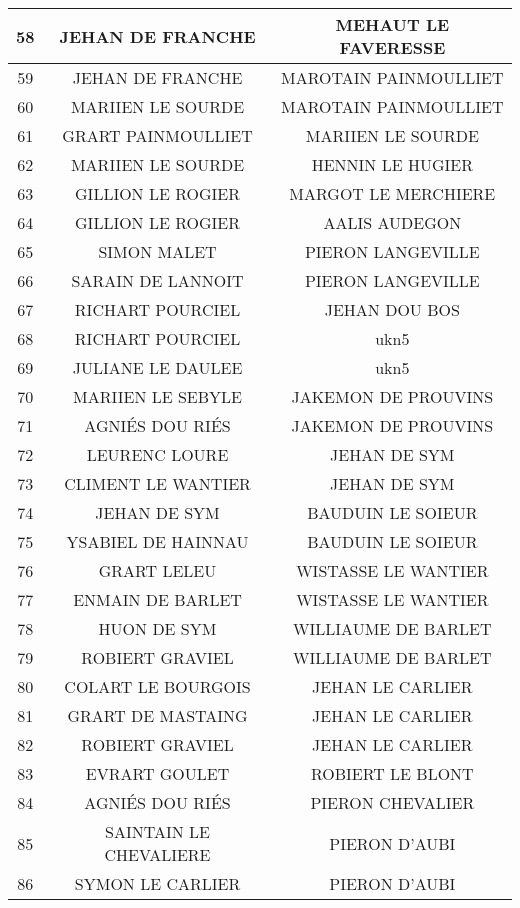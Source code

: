 \begin{center}
\begin{longtable}{|c|c|c|}
\hline	58	&	JEHAN DE FRANCHE	&	MEHAUT LE FAVERESSE	\\
\hline	59	&	JEHAN DE FRANCHE	&	MAROTAIN PAINMOULLIET	\\
\hline	60	&	MARIIEN LE SOURDE	&	MAROTAIN PAINMOULLIET	\\
\hline	61	&	GRART PAINMOULLIET	&	MARIIEN LE SOURDE	\\
\hline	62	&	MARIIEN LE SOURDE	&	HENNIN LE HUGIER	\\
\hline	63	&	GILLION LE ROGIER	&	MARGOT LE MERCHIERE	\\
\hline	64	&	GILLION LE ROGIER	&	AALIS AUDEGON	\\
\hline	65	&	SIMON MALET	&	PIERON LANGEVILLE	\\
\hline	66	&	SARAIN DE LANNOIT	&	PIERON LANGEVILLE	\\
\hline	67	&	RICHART POURCIEL	&	JEHAN DOU BOS	\\
\hline	68	&	RICHART POURCIEL	&	ukn5	\\
\hline	69	&	JULIANE LE DAULEE	&	ukn5	\\
\hline	70	&	MARIIEN LE SEBYLE	&	JAKEMON DE PROUVINS	\\
\hline	71	&	AGNIÉS DOU RIÉS	&	JAKEMON DE PROUVINS	\\
\hline	72	&	LEURENC LOURE	&	JEHAN DE SYM	\\
\hline	73	&	CLIMENT LE WANTIER	&	JEHAN DE SYM	\\
\hline	74	&	JEHAN DE SYM	&	BAUDUIN LE SOIEUR	\\
\hline	75	&	YSABIEL DE HAINNAU	&	BAUDUIN LE SOIEUR	\\
\hline	76	&	GRART LELEU	&	WISTASSE LE WANTIER	\\
\hline	77	&	ENMAIN DE BARLET	&	WISTASSE LE WANTIER	\\
\hline	78	&	HUON DE SYM	&	WILLIAUME DE BARLET	\\
\hline	79	&	ROBIERT GRAVIEL	&	WILLIAUME DE BARLET	\\
\hline	80	&	COLART LE BOURGOIS	&	JEHAN LE CARLIER	\\
\hline	81	&	GRART DE MASTAING	&	JEHAN LE CARLIER	\\
\hline	82	&	ROBIERT GRAVIEL	&	JEHAN LE CARLIER	\\
\hline	83	&	EVRART GOULET	&	ROBIERT LE BLONT	\\
\hline	84	&	AGNIÉS DOU RIÉS	&	PIERON CHEVALIER	\\
\hline	85	&	SAINTAIN LE CHEVALIERE	&	PIERON D'AUBI	\\
\hline	86	&	SYMON LE CARLIER	&	PIERON D'AUBI	\\

\end{longtable}
\end{center}
